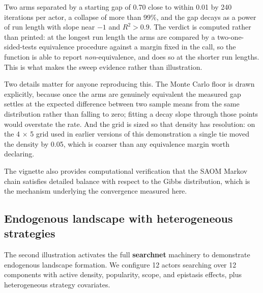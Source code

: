 \documentclass[
]{article}
\begin{document}
Two arms separated by a starting gap of 0.70 close to within 0.01 by 240
iterations per actor, a collapse of more than 99\%, and the gap decays
as a power of run length with slope near \(-1\) and \(R^2 > 0.9\). The
verdict is computed rather than printed: at the longest run length the
arms are compared by a two-one-sided-tests equivalence procedure against
a margin fixed in the call, so the function is able to report
\emph{non}-equivalence, and does so at the shorter run lengths. This is
what makes the sweep evidence rather than illustration.

Two details matter for anyone reproducing this. The Monte Carlo floor is
drawn explicitly, because once the arms are genuinely equivalent the
measured gap settles at the expected difference between two sample means
from the same distribution rather than falling to zero; fitting a decay
slope through those points would overstate the rate. And the grid is
sized so that density has resolution: on the 4 \(\times\) 5 grid used in
earlier versions of this demonstration a single tie moved the density by
0.05, which is coarser than any equivalence margin worth declaring.

The vignette also provides computational verification that the SAOM
Markov chain satisfies detailed balance with respect to the Gibbs
distribution, which is the mechanism underlying the convergence measured
here.

\subsection{Endogenous landscape with heterogeneous
strategies}\label{sec:endogenous}

The second illustration activates the full \textbf{searchnet} machinery
to demonstrate endogenous landscape formation. We configure 12 actors
searching over 12 components with active density, popularity, scope, and
epistasis effects, plus heterogeneous strategy covariates.
\end{document}
